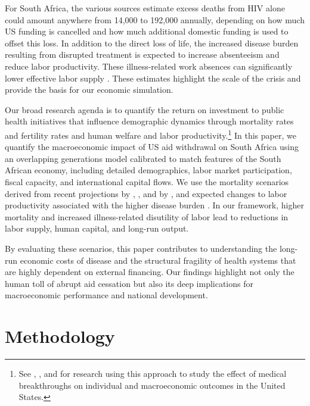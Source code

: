 \documentclass[letterpaper,12pt]{article}
\theoremstyle{definition}
\begin{document}
\begin{spacing}{1.5}
For South Africa, the various sources estimate excess deaths from HIV alone could amount anywhere from 14,000 to 192,000 annually, depending on how much US funding is cancelled and how much additional domestic funding is used to offset this loss. In addition to the direct loss of life, the increased disease burden resulting from disrupted treatment is expected to increase absenteeism and reduce labor productivity. These illness-related work absences can significantly lower effective labor supply \citep{Keogh2024,Panda2024}. These estimates highlight the scale of the crisis and provide the basis for our economic simulation.

Our broad research agenda is to quantify the return on investment to public health initiatives that influence demographic dynamics through mortality rates and fertility rates and human welfare and labor productivity.\footnote{See \citet{DeBackerEtAl:2025}, \citet{RomanniEtAl:2025}, and \citet{RomanniEtAl:forthcoming} for research using this approach to study the effect of medical breakthroughs on individual and macroeconomic outcomes in the United States.} In this paper, we quantify the macroeconomic impact of US aid withdrawal on South Africa using an overlapping generations model calibrated to match features of the South African economy, including detailed demographics, labor market participation, fiscal capacity, and international capital flows. We use the mortality scenarios derived from recent projections by \citet{Brink2025}, \citet{Gandhi2025}, and by \citet{KS2025}, and expected changes to labor productivity associated with the higher disease burden \citep{Keogh2024,Panda2024}. In our framework, higher mortality and increased illness-related disutility of labor lead to reductions in labor supply, human capital, and long-run output.

By evaluating these scenarios, this paper contributes to understanding the long-run economic costs of disease and the structural fragility of health systems that are highly dependent on external financing. Our findings highlight not only the human toll of abrupt aid cessation but also its deep implications for macroeconomic performance and national development.


\section{Methodology}\label{SecMethod}


\end{spacing}
\end{document}

